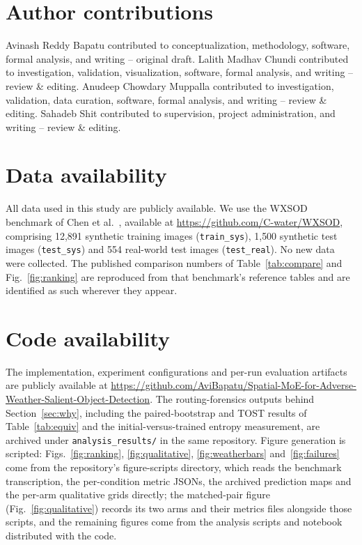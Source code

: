\documentclass[10pt,a4paper,twocolumn,twoside]{article}
\begin{document}
\section*{Author contributions}

Avinash Reddy Bapatu contributed to conceptualization, methodology, software, formal analysis, and writing -- original draft. Lalith Madhav Chundi contributed to investigation, validation, visualization, software, formal analysis, and writing -- review \& editing. Anudeep Chowdary Muppalla contributed to investigation, validation, data curation, software, formal analysis, and writing -- review \& editing. Sahadeb Shit contributed to supervision, project administration, and writing -- review \& editing.

\section*{Data availability}

All data used in this study are publicly available. We use the WXSOD benchmark of
Chen et al.~\cite{wxsod2025}, available at
\url{https://github.com/C-water/WXSOD}, comprising 12{,}891 synthetic training images
(\texttt{train\_sys}), 1{,}500 synthetic test images (\texttt{test\_sys}) and 554 real-world
test images (\texttt{test\_real}). No new data were collected. The published comparison
numbers of Table~\ref{tab:compare} and Fig.~\ref{fig:ranking} are reproduced from that
benchmark's reference tables and are identified as such wherever they appear.

\section*{Code availability}

The implementation, experiment configurations and per-run evaluation artifacts are publicly
available at
\url{https://github.com/AviBapatu/Spatial-MoE-for-Adverse-Weather-Salient-Object-Detection}.
The routing-forensics outputs behind Section~\ref{sec:why}, including the paired-bootstrap and TOST results of Table~\ref{tab:equiv} and the initial-versus-trained entropy measurement, are archived under \texttt{analysis\_results/} in the same repository.
Figure generation is scripted: Figs.~\ref{fig:ranking}, \ref{fig:qualitative},
\ref{fig:weatherbars} and~\ref{fig:failures} come from the repository's figure-scripts
directory, which reads the benchmark transcription, the per-condition metric JSONs, the
archived prediction maps and the per-arm qualitative grids directly; the matched-pair figure
(Fig.~\ref{fig:qualitative}) records its two arms and their metrics files alongside those
scripts, and the remaining figures come from the analysis scripts and notebook distributed
with the code.
\end{document}
